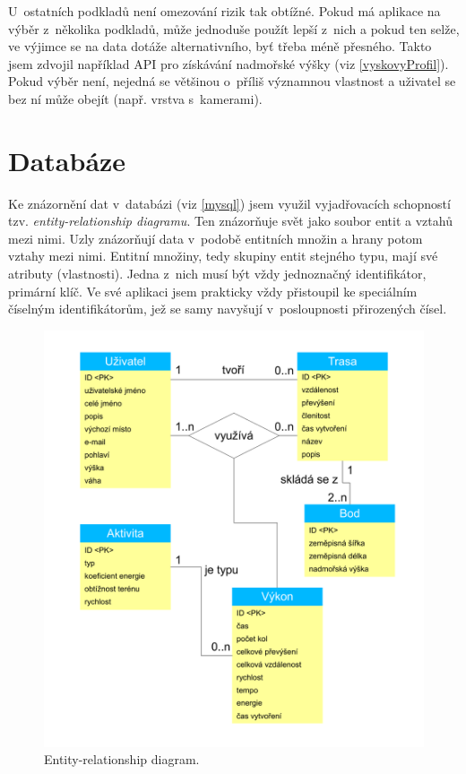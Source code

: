 U~ostatních podkladů není omezování rizik tak obtížné. Pokud má
aplikace na výběr z~několika podkladů, může jednoduše použít lepší
z~nich a pokud ten selže, ve výjimce se na data dotáže alternativního,
byť třeba méně přesného. Takto jsem zdvojil například API pro
získávání nadmořské výšky (viz \ref{vyskovyProfil}). Pokud výběr
není, nejedná se většinou o~příliš významnou vlastnost a uživatel se
bez ní může obejít (např. vrstva s~kamerami).

\section{Databáze}
Ke znázornění dat v~databázi (viz \ref{mysql}) jsem využil
vyjadřovacích schopností tzv. {\it entity-relationship diagramu}. Ten znázorňuje svět jako
soubor entit a vztahů mezi nimi. Uzly znázorňují data v~podobě
entitních množin a hrany potom vztahy mezi nimi. Entitní množiny,
tedy skupiny entit stejného typu, mají své atributy (vlastnosti).
Jedna z~nich musí být vždy jednoznačný identifikátor, primární klíč.
Ve své aplikaci jsem prakticky vždy přistoupil ke speciálním číselným
identifikátorům, jež se samy navyšují v~posloupnosti přirozených
čísel.

\begin{figure}[p]
	\includegraphics[width=\textwidth, keepaspectratio]{fig/erd}
	\caption{Entity-relationship diagram.}
	\label{obrErd}
\end{figure}

